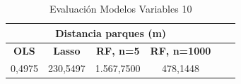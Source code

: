 \documentclass[conference, 10pt]{IEEEtran}
\begin{document}
\begin{table}[htbp]
\caption{Evaluación Modelos Variables 10}
\begin{center}
\begin{tabular}{|c|c|c|c|c|c|}
\hline
\multicolumn{4}{|c|}{\textbf{Distancia parques (m)}} \\
\cline{1-4} 
\hline
\textbf{OLS}&\textbf{Lasso}&\textbf{RF, n=5}&\textbf{RF, n=1000}\\
\hline
 0,4975&230,5497&1.567,7500&478,1448\\
 	\hline
\end{tabular}
\label{tab_10}
\end{center}
\end{table}


\end{document}
